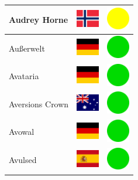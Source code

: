 \documentclass[12pt, a4paper, twoside]{report}
\begin{document}
\begin{center}
\begin{longtable}{|p{5cm}|p{2cm}|p{2cm}|}
Audrey Horne & \includegraphics[width=1cm]{4x3/no} & \includegraphics[width=1cm]{likes/m} \\ \hline
Außerwelt & \includegraphics[width=1cm]{4x3/de} & \includegraphics[width=1cm]{likes/y} \\ \hline
Avataria & \includegraphics[width=1cm]{4x3/de} & \includegraphics[width=1cm]{likes/y} \\ \hline
Aversions Crown & \includegraphics[width=1cm]{4x3/au} & \includegraphics[width=1cm]{likes/y} \\ \hline
Avowal & \includegraphics[width=1cm]{4x3/de} & \includegraphics[width=1cm]{likes/y} \\ \hline
Avulsed & \includegraphics[width=1cm]{4x3/es} & \includegraphics[width=1cm]{likes/y} \\ \hline

\end{longtable}
\end{center}
\end{document}

